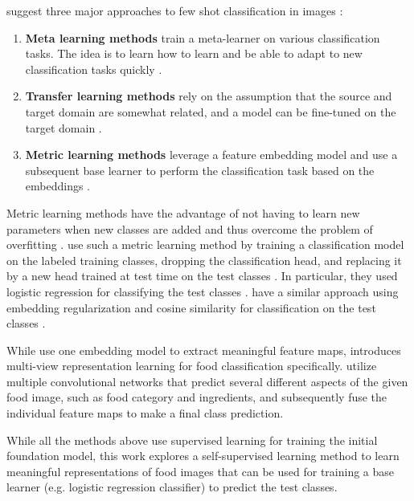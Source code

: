 \citeauthor{li_deep_2023} suggest three major approaches to few shot classification in images \cite{li_deep_2023}:
\begin{enumerate}
	\item{\textbf{Meta learning methods} train a meta-learner on various classification tasks. The idea is to learn
	how to learn and be able to adapt to new classification tasks quickly \cite{li_deep_2023}.}
	\item{\textbf{Transfer learning methods} rely on the assumption that the source and target domain are 
	somewhat related, and a model can be fine-tuned on the target domain \cite{li_deep_2023}.}
	\item{\textbf{Metric learning methods} leverage a feature embedding model and use a subsequent base learner 
	to perform the classification task based on the embeddings \cite{li_deep_2023}.}
\end{enumerate}

Metric learning methods have the advantage of not having to learn new parameters when new classes are added 
and thus overcome the problem of overfitting \cite{li_deep_2023}. \citeauthor{tian_rethinking_2020} use such a metric learning method by training a classification model on the labeled training classes, 
dropping the classification head, and replacing it by a new head trained at test time on the test classes \cite{tian_rethinking_2020}. In particular, they used logistic regression for classifying the test classes \cite{tian_rethinking_2020}. 
\citeauthor{dhillon_baseline_2020} have a similar approach using embedding regularization and cosine similarity 
for classification on the test classes \cite{dhillon_baseline_2020}.

While \cite{tian_rethinking_2020, dhillon_baseline_2020} use one embedding model to extract meaningful feature maps, 
\cite{jiang_few-shot_2020} introduces multi-view representation learning for food classification specifically.
\citeauthor{jiang_few-shot_2020} utilize multiple convolutional networks that predict several different aspects 
of the given food image, such as food category and ingredients, and subsequently fuse the individual feature maps to 
make a final class prediction.

While all the methods above use supervised learning for training the initial foundation model, this work 
explores a self-supervised learning method to learn meaningful representations of food images that can 
be used for training a base learner (e.g. logistic regression classifier) to predict the test classes.

